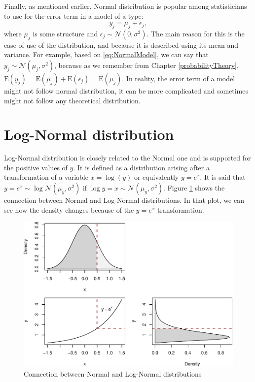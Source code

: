 \documentclass[
]{book}
\theoremstyle{definition}
\theoremstyle{definition}
\theoremstyle{definition}
\theoremstyle{definition}
\theoremstyle{remark}
\begin{document}
Finally, as mentioned earlier, Normal distribution is popular among statisticians to use for the error term in a model of a type:
\begin{equation}
    y_j = \mu_j + \epsilon_j,
    \label{eq:NormalModel}
\end{equation}
where \(\mu_j\) is some structure and \(\epsilon_j \sim \mathcal{N}(0, \sigma^2)\). The main reason for this is the ease of use of the distribution, and because it is described using its mean and variance. For example, based on \eqref{eq:NormalModel}, we can say that \(y_j \sim \mathcal{N}(\mu_j, \sigma^2)\), because as we remember from Chapter \ref{probabilityTheory}, \(\mathrm{E}(y_j)=\mathrm{E}(\mu_j) + \mathrm{E}(\epsilon_j)=\mathrm{E}(\mu_j)\). In reality, the error term of a model might not follow normal distribution, it can be more complicated and sometimes might not follow any theoretical distribution.

\section{Log-Normal distribution}\label{distributionLogNormal}

Log-Normal distribution is closely related to the Normal one and is supported for the positive values of \(y\). It is defined as a distribution arising after a transformation of a variable \(x=\log(y)\) or equivalently \(y=e^x\). It is said that \(y=e^x \sim \log\mathcal{N}(\mu_y, \sigma^2)\) if \(\log y = x \sim \mathcal{N}(\mu_y, \sigma^2)\). Figure \ref{fig:normalLogConnection} shows the connection between Normal and Log-Normal distributions. In that plot, we can see how the density changes because of the \(y=e^x\) transformation.

\begin{figure}
\centering
\includegraphics{Svetunkov---Statistics-for-Business-Analytics_files/figure-latex/normalLogConnection-1.pdf}
\caption{\label{fig:normalLogConnection}Connection between Normal and Log-Normal distributions}
\end{figure}
\end{document}
